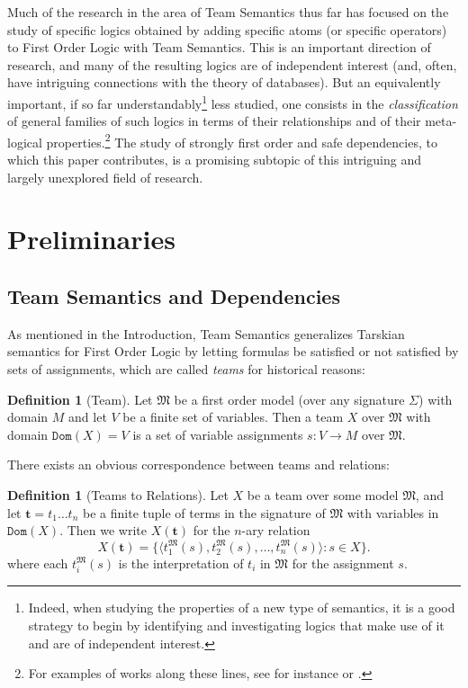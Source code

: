 \documentclass{article}
\theoremstyle{definition}
\newtheorem{Definition}[Theorem]{Definition}
\newcommand{\tuple}{\mathbf}
\newcommand{\M}{\mathfrak M}
\newcommand{\dom}{\texttt{Dom}}
\begin{document}
Much of the research in the area of Team Semantics thus far has focused on the study of specific logics obtained by adding specific atoms (or specific operators) to First Order Logic with Team Semantics. This is an important direction of research, and many of the resulting logics are of independent interest (and, often, have intriguing connections with the theory of databases). But an equivalently important, if so far understandably\footnote{Indeed, when studying the properties of a new type of semantics, it is a good strategy to begin by identifying and investigating logics that make use of it and are of independent interest.} less studied, one consists in the \emph{classification} of general families of such logics in terms of their relationships and of their meta-logical properties.\footnote{For examples of works along these lines, see for instance \cite{galliani2015upwards} or \cite{kontinen2016decidability}.} The study of strongly first order and safe dependencies, to which this paper contributes, is a promising subtopic of this intriguing and largely unexplored field of research.

\section{Preliminaries}
\subsection{Team Semantics and Dependencies}
As mentioned in the Introduction, Team Semantics generalizes Tarskian semantics for First Order Logic by letting formulas be satisfied or not satisfied by sets of assignments, which are called \emph{teams} for historical reasons: 
\begin{Definition}[Team]
Let $\mathfrak M$ be a first order model (over any signature $\Sigma$) with domain $M$ and let $V$ be a finite set of variables. Then a team $X$ over $\M$ with domain $\dom(X) = V$ is a set of variable assignments $s: V \rightarrow M$ over $\M$.
\end{Definition}
There exists an obvious correspondence between teams and relations: 
\begin{Definition}[Teams to Relations]
Let $X$ be a team over some model $\M$, and let $\tuple t = t_1 \ldots t_n$ be a finite tuple of terms in the signature of $\M$ with variables in $\dom(X)$. Then we write $X(\tuple t)$ for the $n$-ary relation 
\[
	X(\tuple t) = \{\langle t_1^\M(s),t_2^\M(s), \ldots, t_n^\M(s)\rangle : s \in X\}.
\]
	where each $t_i^\M(s)$ is the interpretation of $t_i$ in $\M$ for the assignment $s$. 
\end{Definition} 
\end{document}

